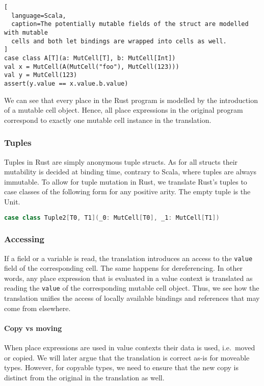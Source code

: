 \begin{lstlisting}[
  language=Scala,
  caption=The potentially mutable fields of the struct are modelled with mutable
  cells and both let bindings are wrapped into cells as well.
]
case class A[T](a: MutCell[T], b: MutCell[Int])
val x = MutCell(A(MutCell("foo"), MutCell(123)))
val y = MutCell(123)
assert(y.value == x.value.b.value)
\end{lstlisting}

We can see that every place in the Rust program is modelled by the
introduction of a mutable cell object. Hence, all place expressions in
the original program correspond to exactly one mutable cell instance in
the translation.

\subsubsection{Tuples}

Tuples in Rust are simply anonymous tuple structs. As for all structs
their mutability is decided at binding time, contrary to Scala, where
tuples are always immutable. To allow for tuple mutation in Rust, we
translate Rust's tuples to case classes of the following form for any
positive arity. The empty tuple is the Unit.

\begin{lstlisting}[language=Scala, style=short]
case class Tuple2[T0, T1](_0: MutCell[T0], _1: MutCell[T1])
\end{lstlisting}

\subsubsection{Accessing}

If a field or a variable is read, the translation introduces an access
to the \passthrough{\lstinline!value!} field of the corresponding cell.
The same happens for dereferencing. In other words, any place expression
that is evaluated in a value context is translated as reading the
\passthrough{\lstinline!value!} of the corresponding mutable cell
object. Thus, we see how the translation unifies the access of locally
available bindings and references that may come from elsewhere.

\paragraph{Copy vs moving}

When place expressions are used in value contexts their data is used, i.e.~moved
or copied. We will later argue that the translation is correct as-is for
moveable types. However, for copyable types, we need to ensure that the new copy
is distinct from the original in the translation as well.

